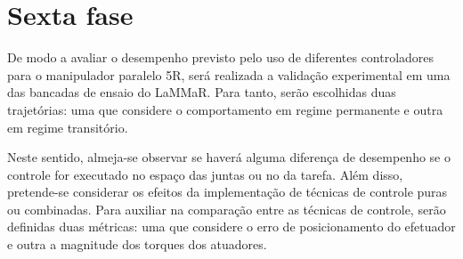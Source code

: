 \documentclass[]{politex}
\begin{document}
\section{Sexta fase} 
De modo a avaliar o desempenho previsto pelo uso de diferentes controladores para o manipulador paralelo 5R, será realizada a validação experimental em uma das bancadas de ensaio do LaMMaR. Para tanto, serão escolhidas duas trajetórias: uma que considere o comportamento em regime permanente e outra em regime transitório. 

Neste sentido, almeja-se observar se haverá alguma diferença de desempenho se o controle for executado no espaço das juntas ou no da tarefa. Além disso, pretende-se considerar os efeitos da implementação de técnicas de controle puras ou combinadas.
Para auxiliar na comparação entre as técnicas de controle, serão definidas duas métricas: uma que considere o erro de posicionamento do efetuador e outra a magnitude dos torques dos atuadores.



\end{document}
